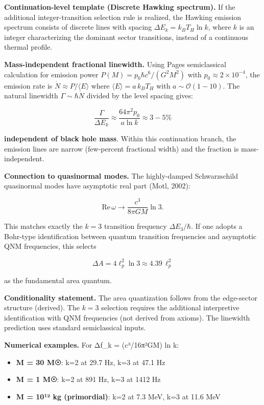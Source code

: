 \textbf{Continuation-level template (Discrete Hawking spectrum).} If the additional integer-transition selection rule is realized, the Hawking emission spectrum consists of discrete lines with spacing \(\Delta E_k = k_B T_H \ln k\), where \(k\) is an integer characterizing the dominant sector transitions, instead of a continuous thermal profile.

\textbf{Mass-independent fractional linewidth.} Using Page\textquotesingle s semiclassical calculation for emission power \(P(M) = p_0 \hbar c^6 / (G^2 M^2)\) with \(p_0 \approx 2 \times 10^{-4}\), the emission rate is \(\dot{N} \approx P /
\langle E \rangle\) where \(\langle E \rangle = a \, k_B T_H\) with \(a \sim
\mathcal{O}(1-10)\). The natural linewidth \(\Gamma \sim \hbar \dot{N}\) divided by the level spacing gives:

\[
\frac{\Gamma}{\Delta E_k} \approx \frac{64\pi^2 p_0}{a \ln k} \approx 3-5\%
\]

\textbf{independent of black hole mass}. Within this continuation branch, the emission lines are narrow (few-percent fractional width) and the fraction is mass-independent.

\textbf{Connection to quasinormal modes.} The highly-damped Schwarzschild quasinormal modes have asymptotic real part (Motl, 2002):

\[
\mathrm{Re}\,\omega \to \frac{c^3}{8\pi G M} \ln 3.
\]

This matches exactly the \(k = 3\) transition frequency \(\Delta E_3 / \hbar\). If one adopts a Bohr-type identification between quantum transition frequencies and asymptotic QNM frequencies, this selects

\[
\Delta A = 4\ell_p^2 \ln 3 \approx 4.39 \, \ell_p^2
\]

as the fundamental area quantum.

\textbf{Conditionality statement.} The area quantization follows from the edge-sector structure (derived). The \(k = 3\) selection requires the additional interpretive identification with QNM frequencies (not derived from axioms). The linewidth prediction uses standard semiclassical inputs.

\textbf{Numerical examples.} For Δf\_k = (c³/16π²GM) ln k:

\begin{itemize}
\tightlist
\item
  \textbf{M = 30 M☉}: k=2 at 29.7 Hz, k=3 at 47.1 Hz
\item
  \textbf{M = 1 M☉}: k=2 at 891 Hz, k=3 at 1412 Hz
\item
  \textbf{M = 10¹² kg (primordial)}: k=2 at 7.3 MeV, k=3 at 11.6 MeV
\end{itemize}

